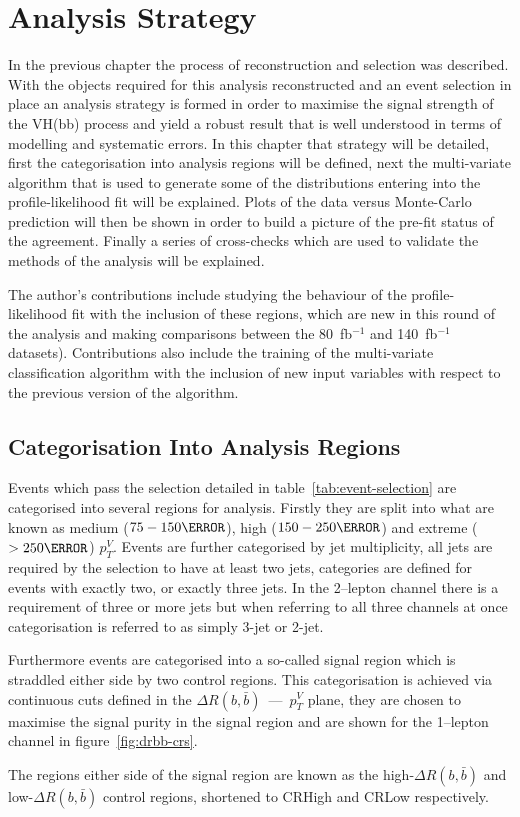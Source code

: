 \chapter{Analysis Strategy}%
\label{ch:strategy}
In the previous chapter the process of reconstruction and selection was
described. With the objects required for this analysis reconstructed and an
event selection in place an analysis strategy is formed in order to maximise the
signal strength of the VH(bb) process and yield a robust result that is well
understood in terms of modelling and systematic errors. In this chapter that
strategy will be detailed, first the categorisation into analysis regions will
be defined, next the multi-variate algorithm that is used to generate some of
the distributions entering into the profile-likelihood fit will be explained.
Plots of the data versus Monte-Carlo prediction will then be shown in order to
build a picture of the pre-fit status of the agreement. Finally a series of
cross-checks which are used to validate the methods of the analysis will be
explained.

The author's contributions include studying the behaviour of the
profile-likelihood fit with the inclusion of these regions, which are new in
this round of the analysis and making comparisons between the 80~fb$^{-1}$ and
140~fb$^{-1}$ datasets). Contributions also include the training of the
multi-variate classification algorithm with the inclusion of new input variables
with respect to the previous version of the algorithm.

\section{Categorisation Into Analysis Regions}
\label{sec:ana-regions}

Events which pass the selection detailed in table~\ref{tab:event-selection} are
categorised into several regions for analysis. Firstly they are split into what
are known as medium ($75 - 150 \GeV$), high ($150 - 250 \GeV$) and extreme ($ >
250 \GeV$) $p_T^{V}$. Events are further categorised by jet multiplicity, all
jets are required by the selection to have at least two jets, categories are
defined for events with exactly two, or exactly three jets. In the 2--lepton
channel there is a requirement of three or more jets but when referring to all
three channels at once categorisation is referred to as simply 3-jet or 2-jet.

Furthermore events are categorised into a so-called signal region which is
straddled either side by two control regions. This categorisation is achieved
via continuous cuts defined in the $\Delta R(b, \bar{b})$~---~$p_T^{V}$ plane,
they are chosen to maximise the signal purity in the signal region and are shown
for the 1--lepton channel in figure~\ref{fig:drbb-crs}.

The regions either side of the signal region are known as the
high-$\Delta R(b, \bar{b})$ and low-$\Delta R(b, \bar{b})$ control regions,
shortened to CRHigh and CRLow respectively.

